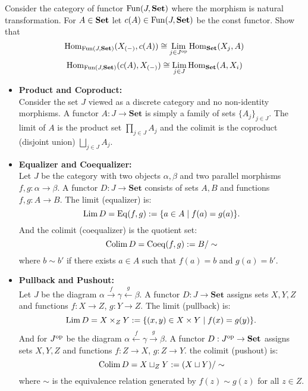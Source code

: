\begin{exercise}
  Consider the category of functor $ \mathrm{Fun}(J,\mathbf{Set})$ where the morphism is natural transformation. For $A\in \mathbf{Set}$ let $c(A) \in \mathrm{Fun}(J,\mathbf{Set})$ be the const functor. Show that 
\[
  \mathrm{Hom}_{\mathrm{Fun}(J,\mathbf{Set})}(X_{(-)},c(A)) \cong \operatorname*{\mathrm{Lim}}_{j\in J^{\mathrm{op}}} \mathrm{Hom}_{\mathbf{Set}}(X_j , A) 
\]
\[
  \mathrm{Hom}_{\mathrm{Fun}(J,\mathbf{Set})}(c(A),X_{(-)}) \cong \operatorname*{\mathrm{Lim}}_{j\in J} \mathrm{Hom}_{\mathbf{Set}}(A, X_i ) 
\]
\end{exercise}
\begin{example}
  \begin{itemize}
    \item \textbf{Product and Coproduct:} \\
      Consider the set $J$ viewed as a discrete category  and no non-identity morphisms. A functor $A : J \to \mathbf{Set}$ is simply a family of sets $\{A_j\}_{j\in J}$. The limit of $A$ is the product set $\prod_{j\in J} A_j$ and the colimit is the coproduct (disjoint union) $\bigsqcup_{j\in J} A_j$.

    \item \textbf{Equalizer and Coequalizer:} \\
    Let $J$ be the category with two objects $\alpha,\beta$ and two parallel morphisms $f, g : \alpha \to \beta$. A functor $D : J \to \mathbf{Set}$ consists of sets $A, B$ and functions $f, g : A \to B$. The limit (equalizer) is:
    \[
      \operatorname*{\mathrm{Lim}} D = \mathrm{Eq}(f,g):= \{ a \in A \mid f(a) = g(a) \}.
    \]
    And the colimit (coequalizer) is the quotient set:
    \[
    \operatorname*{\mathrm{Colim}} D = \mathrm{Coeq}(f,g):=B / \sim
    \]
    where $b \sim b'$ if there exists $a \in A$ such that $f(a) = b$ and $g(a) = b'$.
    \item \textbf{Pullback and Pushout: } \\
    Let $J$ be the diagram $\alpha \xrightarrow{f} \gamma \xleftarrow{g} \beta$. A functor $D : J \to \mathbf{Set}$ assigns sets $X, Y, Z$ and functions $f : X \to Z$, $g : Y \to Z$. The limit (pullback) is:
    \[
    \operatorname*{\mathrm{Lim}} D = X \times_Z Y := \{ (x, y) \in X \times Y \mid f(x) = g(y) \}.
    \]
  And for $J^{\mathrm{op}}$ be the diagram $\alpha \xleftarrow{f} \gamma \xrightarrow{g} \beta$. A functor $D : J^{\mathrm{op}} \to \mathbf{Set}$ assigns sets $X, Y, Z$ and functions $f :  Z\to X$, $g : Z \to Y$. the colimit (pushout) is: 
  \[
    \operatorname*{\mathrm{Colim}} D = X \sqcup_Z Y := (X \sqcup Y) / \sim
    \]
    where $\sim$ is the equivalence relation generated by $f(z) \sim g(z)$ for all $z \in Z$.

   \end{itemize}
\end{example}
